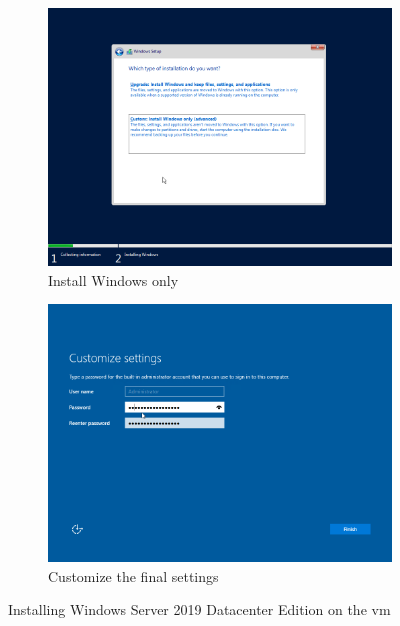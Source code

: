 \begin{figure}[!htb]\ContinuedFloat
	\begin{subfigure}{0.5\textwidth}
		\captionsetup{width=0.8\linewidth}
		\includegraphics[width=0.9\linewidth]{img/Methodologie/Migration8.png}
		\centering
		\caption{Install Windows only}
	\end{subfigure}
	\begin{subfigure}{0.5\textwidth}
		\captionsetup{width=0.8\linewidth}
		\includegraphics[width=0.9\linewidth]{img/Methodologie/Migration9.png} 
		\centering	
		\caption{Customize the final settings}
	\end{subfigure}
	\caption[Installing Windows Server]{Installing Windows Server 2019 Datacenter Edition on the \acrshort{vm}}
	\label{fig:WSInstallation}
\end{figure}
\clearpage
